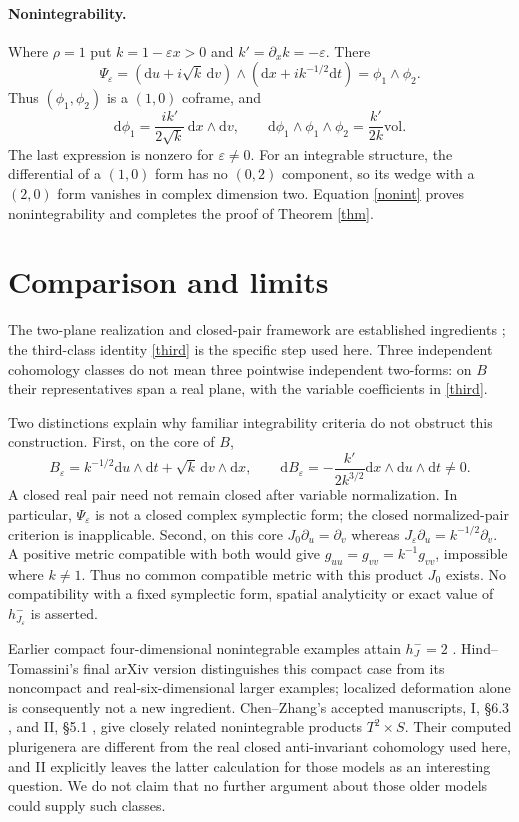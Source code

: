 \documentclass[11pt]{article}
\newcommand{\vol}{\mathrm{vol}}
\newcommand{\dd}{\mathrm d}
\begin{document}
\paragraph{Nonintegrability.}
Where $\rho=1$ put $k=1-\varepsilon x>0$ and $k'=\partial_x k=-\varepsilon$.
There
\[
 \Psi_\varepsilon
  =(\dd u+i\sqrt{k}\,\dd v)\wedge
       (\dd x+i k^{-1/2}\dd t)=\phi_1\wedge\phi_2 .
\]
Thus $(\phi_1,\phi_2)$ is a $(1,0)$ coframe, and
\begin{equation}\label{nonint}
 \dd\phi_1=\frac{i k'}{2\sqrt{k}}\,\dd x\wedge\dd v,\qquad
 \dd\phi_1\wedge\phi_1\wedge\phi_2=\frac{k'}{2k}\vol .
\end{equation}
The last expression is nonzero for $\varepsilon\ne0$. For an integrable
structure, the differential of a $(1,0)$ form has no $(0,2)$ component, so
its wedge with a $(2,0)$ form vanishes in complex dimension two.
Equation \eqref{nonint} proves nonintegrability and completes the proof
of Theorem \ref{thm}.

\section{Comparison and limits}
The two-plane realization and closed-pair framework are established
ingredients \cite{Donaldson,BK}; the third-class identity \eqref{third}
is the specific step used here. Three independent cohomology classes do
not mean three pointwise independent two-forms: on $B$ their representatives
span a real plane, with the variable coefficients in \eqref{third}.

Two distinctions explain why familiar integrability criteria do not obstruct
this construction. First, on the core of $B$,
\[
 B_\varepsilon=k^{-1/2}\dd u\wedge\dd t+\sqrt{k}\,\dd v\wedge\dd x,\qquad
 \dd B_\varepsilon=-\frac{k'}{2k^{3/2}}\dd x\wedge\dd u\wedge\dd t\ne0 .
\]
A closed real pair need not remain closed after variable normalization.
In particular, $\Psi_\varepsilon$ is not a closed complex symplectic form;
the closed normalized-pair criterion \cite[Theorem 6]{BK} is inapplicable.
Second, on this core $J_0\partial_u=\partial_v$ whereas
$J_\varepsilon\partial_u=k^{-1/2}\partial_v$. A positive metric compatible
with both would give $g_{uu}=g_{vv}=k^{-1}g_{vv}$, impossible where
$k\ne1$. Thus no common compatible metric with this product $J_0$ exists.
No compatibility with a fixed symplectic form, spatial analyticity or exact
value of $h_{J_\varepsilon}^-$ is asserted.

Earlier compact four-dimensional nonintegrable examples attain $h_J^-=2$
\cite{DLZ,HT}. Hind--Tomassini's final arXiv version
\cite[Proposition 4.2]{HT} distinguishes this compact case from its
noncompact and real-six-dimensional larger examples; localized deformation
alone is consequently not a new ingredient.
Chen--Zhang's accepted manuscripts, I, \S6.3 \cite{CZI}, and II, \S5.1
\cite{CZII}, give closely related nonintegrable products $T^2\times S$. Their computed
plurigenera are different from the real closed anti-invariant cohomology
used here, and II explicitly leaves the latter calculation for those models
as an interesting question. We do not claim that no further argument about
those older models could supply such classes.
\end{document}
